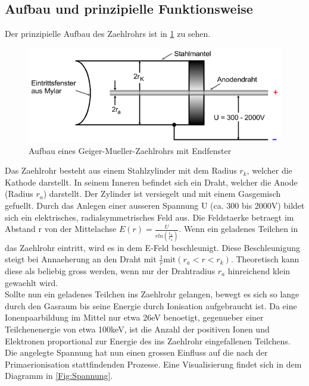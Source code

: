 \documentclass[titlepage=firstcover, captions=tableheading]{scrartcl}
\begin{document}
\subsection{Aufbau und prinzipielle Funktionsweise}
Der prinzipielle Aufbau des Zaehlrohrs ist in \ref{Fig:Aufbau} zu sehen.
\begin{figure}[H]
    \centering
    \includegraphics{"Aufbau_Geiger.png"}
    \caption{Aufbau eines Geiger-Mueller-Zaehlrohrs mit Endfenster}
    \label{Fig:Aufbau}
\end{figure}
 \noindent Das Zaehlrohr besteht aus einem Stahlzylinder mit dem Radius $r_k$, welcher die Kathode darstellt. In seinem Inneren befindet sich ein Draht, welcher die Anode (Radius $r_a$) darstellt. Der Zylinder ist versiegelt und mit einem Gasgemisch gefuellt. Durch das Anlegen einer ausseren Spannung U (ca. 300 bis 2000V) bildet sich ein elektrisches, radialsymmetrisches Feld aus. Die Feldstaerke betraegt im Abstand r von der Mittelachse $E(r)=\frac{U}{rln(\frac{r_k}{r_a})}$.
 Wenn ein geladenes Teilchen in das Zaehlrohr eintritt, wird es in dem E-Feld beschleunigt. Diese Beschleunigung steigt bei Annaeherung an den Draht mit $\frac{1}{r} \text{mit} (r_a < r < r_k)$. Theoretisch kann diese als beliebig gross werden, wenn nur der Drahtradius $r_a$ hinreichend klein gewaehlt wird.\\
 Sollte nun ein geladenes Teilchen ins Zaehlrohr gelangen, bewegt es sich so lange durch den Gasraum bis seine Energie durch Ionisation aufgebraucht ist. Da eine Ionenpaarbildung im Mittel nur etwa 26eV benoetigt, gegenueber einer Teilchenenergie von etwa 100keV, ist die Anzahl der positiven Ionen und Elektronen proportional zur Energie des ins Zaehlrohr eingefallenen Teilchens. Die angelegte Spannung hat nun einen grossen Einfluss auf die nach der Primaerionisation stattfindenden Prozesse. Eine Visualisierung findet sich in dem Diagramm in \ref{Fig:Spannung}.
\end{document}
